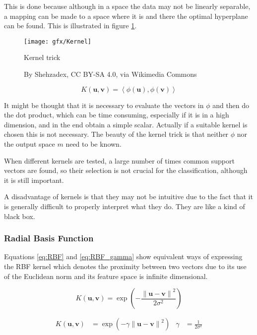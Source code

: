 This is done because although in a space the data may not be linearly separable, a mapping can be made to a space where it is and there the optimal hyperplane can be found. This is illustrated in figure \ref{fig:kernel}.

\begin{figure}
	\myfloatalign
	\texttt{[image: gfx/Kernel]}
	\caption{Kernel trick}
	\caption*{By Shehzadex, CC BY-SA 4.0, via Wikimedia Commons}
	\label{fig:kernel}
\end{figure}

\begin{equation} \label{eq:kernel}
	K(\mathbf{u}, \mathbf{v}) = \left \langle \phi (\mathbf{u}), \phi (\mathbf{v})\right \rangle
\end{equation}

It might be thought that it is necessary to evaluate the vectors in \(\phi\) and then do the dot product, which can be time consuming, especially if it is in a high dimension, and in the end obtain a simple scalar. Actually if a suitable kernel is chosen this is not necessary. The beauty of the kernel trick is that neither \(\phi\) nor the output space \(m\) need to be known.

When different kernels are tested, a large number of times common support vectors are found, so their selection is not crucial for the classification, although it is still important.

A disadvantage of kernels is that they may not be intuitive due to the fact that it is generally difficult to properly interpret what they do. They are like a kind of black box.

\subsubsection{Radial Basis Function}

Equations \ref{eq:RBF} and \ref{eq:RBF_gamma} show equivalent ways of expressing the \ac{RBF} kernel which denotes the proximity between two vectors due to its use of the Euclidean norm and its feature space is infinite dimensional.

\begin{equation} \label{eq:RBF}
	K(\mathbf{u}, \mathbf{v}) = \exp{\left ( - \frac{\left \| \mathbf{u} - \mathbf{v} \right \|^2}{2 \sigma^2} \right )}
\end{equation}

\begin{align} \label{eq:RBF_gamma}
	K(\mathbf{u}, \mathbf{v}) &= \exp{\left ( - \gamma \left \| \mathbf{u} - \mathbf{v} \right \|^2\right )} & \gamma &= \frac{1}{2 \sigma^2}
\end{align}

